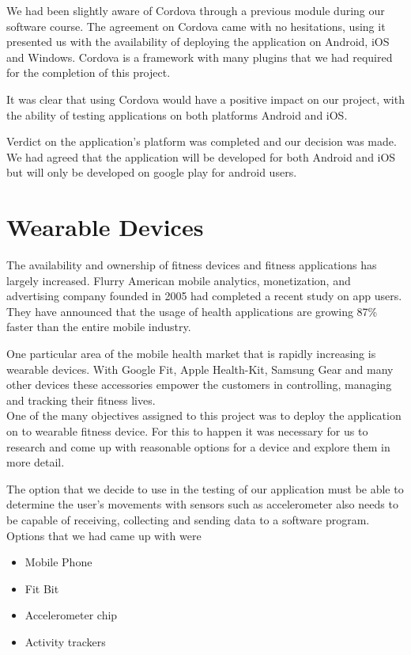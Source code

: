 \documentclass[a4paper,12pt]{report}
\begin{document}
We had been slightly aware of Cordova through a previous module during our software course.
The agreement on Cordova came with no hesitations, using it presented us with the availability of deploying the application on Android, iOS and Windows. 
Cordova is a framework with many plugins that we had required for the completion of this project. 

It was clear that using Cordova would have a positive impact on our project, with the ability of testing applications on both platforms Android and iOS. \cite{cordova}

Verdict on the application's platform was completed and our decision was made. We had agreed that the application will be developed for both Android and iOS but will only be developed on google play for android users.  

\section{Wearable Devices}
The availability and ownership of fitness devices and fitness applications has largely increased. Flurry American mobile analytics, monetization, and advertising company founded in 2005 had completed a recent study on app users.
They have announced that the usage of health applications are growing 87\% faster than the entire mobile industry.

One particular area of the mobile health market that is rapidly increasing is wearable devices. With Google Fit, Apple Health-Kit, Samsung Gear and many other devices these accessories empower the customers in controlling, managing and tracking their fitness lives.\cite{rhodes2014accessing}\\

One of the many objectives assigned to this project was to deploy the application on to wearable fitness device.
For this to happen it was necessary for us to research and come up with reasonable options for a device and explore them in more detail.

The option that we decide to use in the testing of our application must be able to determine the user's movements with sensors such as accelerometer also needs to be capable of receiving, collecting and sending data to a software program.\\

Options that we had came up with were 
\begin{itemize}
    \item Mobile Phone 
    \item Fit Bit
    \item Accelerometer chip
    \item Activity trackers
\end{itemize}
\end{document}
